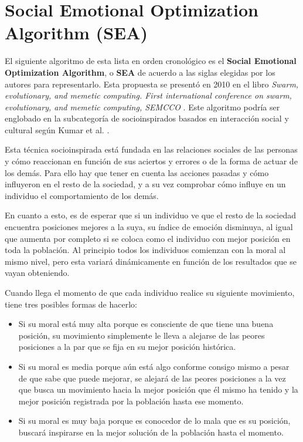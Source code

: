 \section{Social Emotional Optimization Algorithm (SEA)}

El siguiente algoritmo de esta lista en orden cronológico es el \textbf{Social Emotional Optimization Algorithm}, o \textbf{SEA} de acuerdo a las siglas elegidas por los autores \cite{sea-chapter} para representarlo. Esta propuesta se presentó en 2010 en el libro \textit{Swarm, evolutionary, and memetic computing. First international conference on swarm, evolutionary, and memetic computing, SEMCCO} \cite{sea-book}. Este algoritmo podría ser englobado en la subcategoría de socioinspirados basados en interacción social y cultural según Kumar et al. \cite{socio-evolution-algorithm}.

Esta técnica socioinspirada está fundada en las relaciones sociales de las personas y cómo reaccionan en función de sus aciertos y errores o de la forma de actuar de los demás. Para ello hay que tener en cuenta las acciones pasadas y cómo influyeron en el resto de la sociedad, y a su vez comprobar cómo influye en un individuo el comportamiento de los demás.

En cuanto a esto, es de esperar que si un individuo ve que el resto de la sociedad encuentra posiciones mejores a la suya, su índice de emoción disminuya, al igual que aumenta por completo si se coloca como el individuo con mejor posición en toda la población. Al principio todos los individuos comienzan con la moral al mismo nivel, pero esta variará dinámicamente en función de los resultados que se vayan obteniendo.

Cuando llega el momento de que cada individuo realice su siguiente movimiento, tiene tres posibles formas de hacerlo:

\begin{itemize}
	\item Si su moral está muy alta porque es consciente de que tiene una buena posición, su movimiento simplemente le lleva a alejarse de las peores posiciones a la par que se fija en su mejor posición histórica.
	\item Si su moral es media porque aún está algo conforme consigo mismo a pesar de que sabe que puede mejorar, se alejará de las peores posiciones a la vez que busca un movimiento hacia la mejor posición que él mismo ha tenido y la mejor posición registrada por la población hasta ese momento.
	\item Si su moral es muy baja porque es conocedor de lo mala que es su posición, buscará inspirarse en la mejor solución de la población hasta el momento.
\end{itemize}

